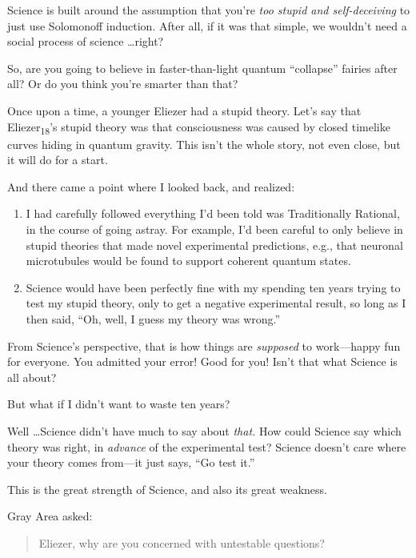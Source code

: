 {
 Science is built around the assumption that you're
\textit{too stupid and self-deceiving} to just use Solomonoff
induction. After all, if it was that simple, we
wouldn't need a social process of science \ldots right?}

{
 So, are you going to believe in faster-than-light quantum
``collapse'' fairies after all? Or
do you think you're smarter than that?}

\myendsectiontext


{
 Once upon a time, a younger Eliezer had a stupid theory.
Let's say that
Eliezer\textsubscript{18}'s stupid theory was that
consciousness was caused by closed timelike curves hiding in quantum
gravity. This isn't the whole story, not even close,
but it will do for a start. }

{
 And there came a point where I looked back, and realized:}

\begin{enumerate}
\item {
 I had carefully followed everything I'd been told
was Traditionally Rational, in the course of going astray. For example,
I'd been careful to only believe in stupid theories
that made novel experimental predictions, e.g., that neuronal
microtubules would be found to support coherent quantum states.}

\item {
 Science would have been perfectly fine with my spending ten years
trying to test my stupid theory, only to get a negative experimental
result, so long as I then said, ``Oh, well, I guess my
theory was wrong.''}
\end{enumerate}

{
 From Science's perspective, that is how things are
\textit{supposed} to work---happy fun for everyone. You admitted your
error! Good for you! Isn't that what Science is all
about?}

{
 But what if I didn't want to waste ten years?}

{
 Well \ldots Science didn't have much to say about
\textit{that.} How could Science say which theory was right, in
\textit{advance} of the experimental test? Science
doesn't care where your theory comes from---it just
says, ``Go test it.''}

{
 This is the great strength of Science, and also its great
weakness.}

{
 Gray Area asked:}

\begin{quote}
{
  Eliezer, why are you concerned with untestable questions?}
\end{quote}

